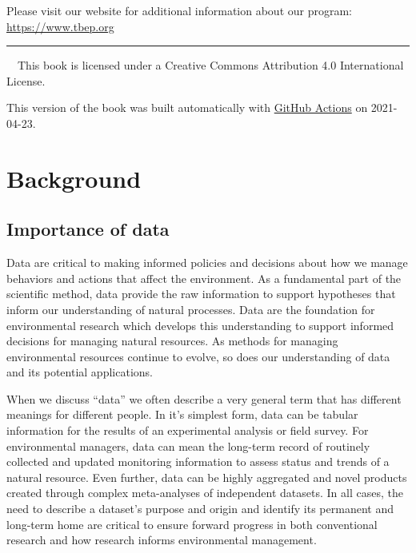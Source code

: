 \documentclass[
]{book}
\begin{document}
Please visit our website for additional information about our program: \url{https://www.tbep.org}

\begin{center}\rule{0.5\linewidth}{0.5pt}\end{center}

~~This book is licensed under a Creative Commons Attribution 4.0 International License.

This version of the book was built automatically with \href{https://github.com/tbep-tech/data-management-sop/actions}{GitHub Actions} on 2021-04-23.

\hypertarget{background}{%
\chapter{Background}\label{background}}

\hypertarget{dataimp}{%
\section{Importance of data}\label{dataimp}}

Data are critical to making informed policies and decisions about how we manage behaviors and actions that affect the environment. As a fundamental part of the scientific method, data provide the raw information to support hypotheses that inform our understanding of natural processes. Data are the foundation for environmental research which develops this understanding to support informed decisions for managing natural resources. As methods for managing environmental resources continue to evolve, so does our understanding of data and its potential applications.

When we discuss ``data'' we often describe a very general term that has different meanings for different people. In it's simplest form, data can be tabular information for the results of an experimental analysis or field survey. For environmental managers, data can mean the long-term record of routinely collected and updated monitoring information to assess status and trends of a natural resource. Even further, data can be highly aggregated and novel products created through complex meta-analyses of independent datasets. In all cases, the need to describe a dataset's purpose and origin and identify its permanent and long-term home are critical to ensure forward progress in both conventional research and how research informs environmental management.
\end{document}
